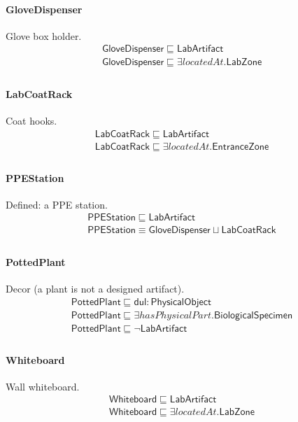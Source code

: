 \documentclass[10pt]{article}
\begin{document}
\paragraph{GloveDispenser} Glove box holder.
\[\begin{array}{l}
\mathsf{GloveDispenser} \sqsubseteq  \mathsf{LabArtifact} \\
\mathsf{GloveDispenser} \sqsubseteq  \exists \mathit{locatedAt}.\mathsf{LabZone} \\
\end{array}\]
\paragraph{LabCoatRack} Coat hooks.
\[\begin{array}{l}
\mathsf{LabCoatRack} \sqsubseteq  \mathsf{LabArtifact} \\
\mathsf{LabCoatRack} \sqsubseteq  \exists \mathit{locatedAt}.\mathsf{EntranceZone} \\
\end{array}\]
\paragraph{PPEStation} Defined: a PPE station.
\[\begin{array}{l}
\mathsf{PPEStation} \sqsubseteq  \mathsf{LabArtifact} \\
\mathsf{PPEStation} \equiv  \mathsf{GloveDispenser} \sqcup  \mathsf{LabCoatRack} \\
\end{array}\]
\paragraph{PottedPlant} Decor (a plant is not a designed artifact).
\[\begin{array}{l}
\mathsf{PottedPlant} \sqsubseteq  \mathsf{dul{:}PhysicalObject} \\
\mathsf{PottedPlant} \sqsubseteq  \exists \mathit{hasPhysicalPart}.\mathsf{BiologicalSpecimen} \\
\mathsf{PottedPlant} \sqsubseteq  \neg \mathsf{LabArtifact} \\
\end{array}\]
\paragraph{Whiteboard} Wall whiteboard.
\[\begin{array}{l}
\mathsf{Whiteboard} \sqsubseteq  \mathsf{LabArtifact} \\
\mathsf{Whiteboard} \sqsubseteq  \exists \mathit{locatedAt}.\mathsf{LabZone} \\
\end{array}\]
\end{document}
